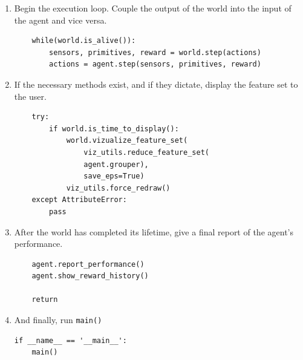 \begin{enumerate}
\item
Begin the execution loop. Couple the output of the world into the input of the agent and vice versa.
\begin{verbatim}    
    while(world.is_alive()):
        sensors, primitives, reward = world.step(actions)
        actions = agent.step(sensors, primitives, reward)
\end{verbatim}

\item
If the necessary methods exist, and if they dictate, display the feature set to the user.        
\begin{verbatim}    
    try:
        if world.is_time_to_display():
            world.vizualize_feature_set(
                viz_utils.reduce_feature_set(
                agent.grouper), 
                save_eps=True)
            viz_utils.force_redraw()
    except AttributeError:
        pass
\end{verbatim}

\item
After the world has completed its lifetime, give a final report of the agent's performance.    
\begin{verbatim}    
    agent.report_performance()
    agent.show_reward_history()
    
    return
\end{verbatim}

\item
And finally, run \texttt{main()}    
\begin{verbatim}    
if __name__ == '__main__':
    main()
\end{verbatim}

\end{enumerate}

